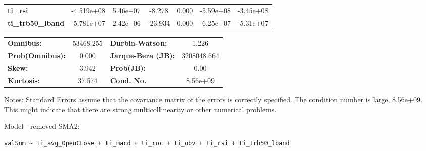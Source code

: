 \begin{center}
\begin{tabular}{lcccccc}
\textbf{ti\_rsi}            &   -4.519e+08  &     5.46e+07     &    -8.278  &         0.000        &    -5.59e+08    &    -3.45e+08     \\
\textbf{ti\_trb50\_lband}   &   -5.781e+07  &     2.42e+06     &   -23.934  &         0.000        &    -6.25e+07    &    -5.31e+07     \\
\bottomrule
\end{tabular}
\begin{tabular}{lclc}
\textbf{Omnibus:}       & 53468.255 & \textbf{  Durbin-Watson:     } &      1.226   \\
\textbf{Prob(Omnibus):} &    0.000  & \textbf{  Jarque-Bera (JB):  } & 3208048.664  \\
\textbf{Skew:}          &    3.942  & \textbf{  Prob(JB):          } &       0.00   \\
\textbf{Kurtosis:}      &   37.574  & \textbf{  Cond. No.          } &   8.56e+09   \\
\bottomrule
\end{tabular}
\end{center}

Notes: \newline
 [1] Standard Errors assume that the covariance matrix of the errors is correctly specified. \newline
 [2] The condition number is large, 8.56e+09. This might indicate that there are \newline
 strong multicollinearity or other numerical problems.

Model - removed SMA2: \begin{verbatim}valSum ~ ti_avg_OpenCLose + ti_macd + ti_roc + ti_obv + ti_rsi + ti_trb50_lband\end{verbatim}

